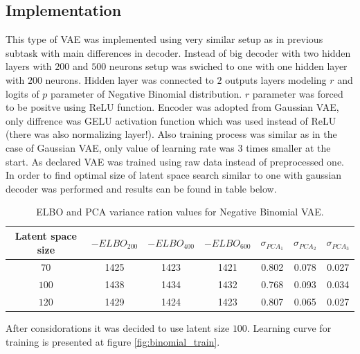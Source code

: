 \documentclass[12pt,a4paper]{article}
\begin{document}
\subsection{Implementation}
This type of VAE was implemented using very similar setup as in previous subtask with main differences in decoder. Instead of big decoder with two
hidden layers with $200$ and $500$ neurons setup was swiched to one with one hidden layer with $200$ neurons. Hidden layer
was connected to $2$ outputs layers modeling $r$ and logits of $p$ parameter of Negative Binomial distribution. $r$ parameter was forced to be positve using
ReLU function. Encoder was adopted from Gaussian VAE, only diffrence was GELU activation function which was used instead of ReLU (there was also normalizing layer!).
Also training process was similar as in the case of Gaussian VAE, only value  of learning rate was 3 times smaller at the start.
As declared VAE was trained using raw data instead of preprocessed one. In order to find optimal size of latent space search similar to one with gaussian decoder 
was performed and results can be found in table below.
\begin{center}
\begin{table}[H]
    \begin{tabular}{ |c| c| c |c |c |c| c| }
    \hline \hline
     Latent space size & $-ELBO_{200}$ & $-ELBO_{400}$ & $-ELBO_{600}$ & $\sigma_{PCA_1}$ &$\sigma_{PCA_2}$ &$\sigma_{PCA_3}$ \\    
    \hline \hline
    $70$ & 1425 &1423 &1421& 0.802& 0.078 & 0.027 \\ 
    \hline
    $100$ & 1438 &1434 & 1432& 0.768 & 0.093 & 0.034 \\
    \hline
    $120$ & 1429 & 1424& 1423 & 0.807 & 0.065 &0.027\\
    \hline \hline
\end{tabular}
\caption{ELBO and PCA variance ration values for  Negative Binomial VAE.}
\end{table}
\end{center}
After considorations it was decided to use latent size $100$. 
Learning curve for training is presented at figure \ref{fig:binomial_train}.
\end{document}
